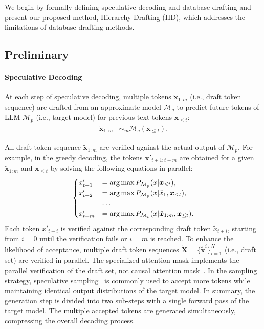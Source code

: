 
We begin by formally defining speculative decoding and database drafting and present our proposed method, Hierarchy Drafting (HD), which addresses the limitations of database drafting methods.

\subsection{Preliminary}

\paragraph{Speculative Decoding} 
At each step of speculative decoding, multiple tokens \(\tilde{\bm{x}}_{1:m}\) (i.e., draft token sequence) are drafted from an approximate model \(\mathcal{M}_q\) to predict future tokens of LLM \(\mathcal{M}_p\) (i.e., target model) for previous text tokens \(\bm{x}_{\leq t}\):
\begin{align}
    \tilde{\bm{x}}_{1:m} &\sim_m \mathcal{M}_q(\bm{x}_{\leq t}).
\end{align}

All draft token sequence \(\tilde{\bm{x}}_{1:m}\) are verified against the actual output of \(\mathcal{M}_p\). For example, in the greedy decoding, the tokens \(\bm{x}'_{t+1:t+m}\) are obtained for a given \(\tilde{\bm{x}}_{1:m}\) and \(\bm{x}_{\leq t}\) by solving the following equations in parallel:
\begin{align}
\begin{cases}
    x'_{t+1} &= \operatorname*{arg\,max} P_{\mathcal{M}_p}(x | \bm{x}_{\leq t}), \\
    x'_{t+2} &= \operatorname*{arg\,max} P_{\mathcal{M}_p}(x | \tilde{x}_{1}, \bm{x}_{\leq t}),\\
    &\dots \\
    x'_{t+m} &= \operatorname*{arg\,max} P_{\mathcal{M}_p}(x | \tilde{\bm{x}}_{1:m}, \bm{x}_{\leq t}).
\end{cases}
\end{align}
Each token \(x'_{t+i}\) is verified against the corresponding draft token \(\tilde{x}_{t+i}\), starting from \(i = 0\) until the verification fails or \(i = m\) is reached.
To enhance the likelihood of acceptance, multiple draft token sequences \(\bm{\tilde{X}} = \{\tilde{\bm{x}}^i\}_{i=1}^N\) (i.e., draft set) are verified in parallel.
The specialized attention mask implements the parallel verification of the draft set, not causal attention mask~\cite{LAD, SpecInfer}.
In the sampling strategy, speculative sampling~\cite{SpecSampling} is commonly used to accept more tokens while maintaining identical output distributions of the target model.
In summary, the generation step is divided into two sub-steps with a single forward pass of the target model. The multiple accepted tokens are generated simultaneously, compressing the overall decoding process.


